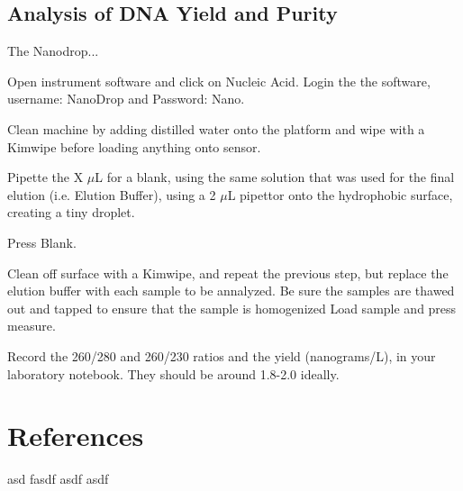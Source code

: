 \documentclass[12pt]{SOP5_beta}\usepackage[]{graphicx}\usepackage[]{xcolor}
\begin{document}
\subsection*{Analysis of DNA Yield and Purity}

\NP The Nanodrop...

\NP Open instrument software and click on Nucleic Acid. Login the the software, username: NanoDrop and Password: Nano.

\NP Clean machine by adding distilled water onto the platform and wipe with a Kimwipe before loading anything onto sensor. 

\NP Pipette the X $\mu$L for a blank, using the same solution that was used for the final elution (i.e. Elution Buffer), using a 2 $\mu$L pipettor onto the hydrophobic surface, creating a tiny droplet.

\NP Press Blank.

\NP Clean off surface with a Kimwipe, and repeat the previous step, but replace the elution buffer with each sample to be annalyzed. Be sure the samples are thawed out and tapped to ensure that the sample is homogenized
\NP Load sample and press measure.

\NP Record the 260/280 and 260/230 ratios and the yield (nanograms/L), in your laboratory notebook. They should be around 1.8-2.0 ideally. 


\section{References}

\NP asd fasdf asdf asdf 
\end{document}
